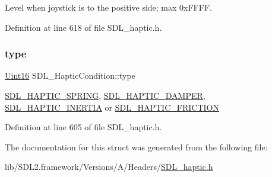 Level when joystick is to the positive side; max 0x\+F\+F\+FF. 

Definition at line 618 of file S\+D\+L\+\_\+haptic.\+h.

\mbox{\label{struct_s_d_l___haptic_condition_a7be55a9a86c05dd1a54a3006781cfa6f}} 
\subsubsection{\texorpdfstring{type}{type}}
{\footnotesize\ttfamily \mbox{\hyperlink{_s_d_l__stdinc_8h_a31fcc0a076c9068668173ee26d33e42b}{Uint16}} S\+D\+L\+\_\+\+Haptic\+Condition\+::type}

\mbox{\hyperlink{_s_d_l__haptic_8h_a3b52d4700380085e2b5d87bb20320fb1}{S\+D\+L\+\_\+\+H\+A\+P\+T\+I\+C\+\_\+\+S\+P\+R\+I\+NG}}, \mbox{\hyperlink{_s_d_l__haptic_8h_a69522f261973e3ea4273486141320a87}{S\+D\+L\+\_\+\+H\+A\+P\+T\+I\+C\+\_\+\+D\+A\+M\+P\+ER}}, \mbox{\hyperlink{_s_d_l__haptic_8h_a14b807471589120395aec28293cf6642}{S\+D\+L\+\_\+\+H\+A\+P\+T\+I\+C\+\_\+\+I\+N\+E\+R\+T\+IA}} or \mbox{\hyperlink{_s_d_l__haptic_8h_a98a5011311168d63921aaac21403a4d8}{S\+D\+L\+\_\+\+H\+A\+P\+T\+I\+C\+\_\+\+F\+R\+I\+C\+T\+I\+ON}} 

Definition at line 605 of file S\+D\+L\+\_\+haptic.\+h.



The documentation for this struct was generated from the following file\+:\begin{DoxyCompactItemize}
\item 
lib/\+S\+D\+L2.\+framework/\+Versions/\+A/\+Headers/\mbox{\hyperlink{_s_d_l__haptic_8h}{S\+D\+L\+\_\+haptic.\+h}}\end{DoxyCompactItemize}
